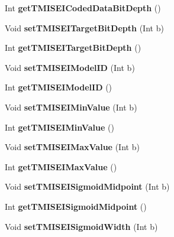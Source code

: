\begin{DoxyCompactItemize}
Int {\bfseries get\+T\+M\+I\+S\+E\+I\+Coded\+Data\+Bit\+Depth} ()
\item 
\mbox{\label{class_t_enc_cfg_a36e120426347b7cce9dad50f16c90fc6}} 
Void {\bfseries set\+T\+M\+I\+S\+E\+I\+Target\+Bit\+Depth} (Int b)
\item 
\mbox{\label{class_t_enc_cfg_a809789928316852bfaa518bc28db1a6e}} 
Int {\bfseries get\+T\+M\+I\+S\+E\+I\+Target\+Bit\+Depth} ()
\item 
\mbox{\label{class_t_enc_cfg_a03940b7d464d8cf66d20376595152112}} 
Void {\bfseries set\+T\+M\+I\+S\+E\+I\+Model\+ID} (Int b)
\item 
\mbox{\label{class_t_enc_cfg_acf28b34e8e07ea6381b33fbccc2d64a7}} 
Int {\bfseries get\+T\+M\+I\+S\+E\+I\+Model\+ID} ()
\item 
\mbox{\label{class_t_enc_cfg_a41bd4868345b67fd8135bb1b38167f6f}} 
Void {\bfseries set\+T\+M\+I\+S\+E\+I\+Min\+Value} (Int b)
\item 
\mbox{\label{class_t_enc_cfg_aff2eb097a7badefc9f1680eb4cd03407}} 
Int {\bfseries get\+T\+M\+I\+S\+E\+I\+Min\+Value} ()
\item 
\mbox{\label{class_t_enc_cfg_adb4d8253a65c6d6205c3509ec2ee46ef}} 
Void {\bfseries set\+T\+M\+I\+S\+E\+I\+Max\+Value} (Int b)
\item 
\mbox{\label{class_t_enc_cfg_ae17c075e9cb4cb8a98f464ae842f4bf0}} 
Int {\bfseries get\+T\+M\+I\+S\+E\+I\+Max\+Value} ()
\item 
\mbox{\label{class_t_enc_cfg_a920c84392afc85874a57e1a4be550f48}} 
Void {\bfseries set\+T\+M\+I\+S\+E\+I\+Sigmoid\+Midpoint} (Int b)
\item 
\mbox{\label{class_t_enc_cfg_abde7371939ebc7033e9fdf64b059676a}} 
Int {\bfseries get\+T\+M\+I\+S\+E\+I\+Sigmoid\+Midpoint} ()
\item 
\mbox{\label{class_t_enc_cfg_a85f05b189d227a033824f7a941c5a968}} 
Void {\bfseries set\+T\+M\+I\+S\+E\+I\+Sigmoid\+Width} (Int b)

\end{DoxyCompactItemize}
